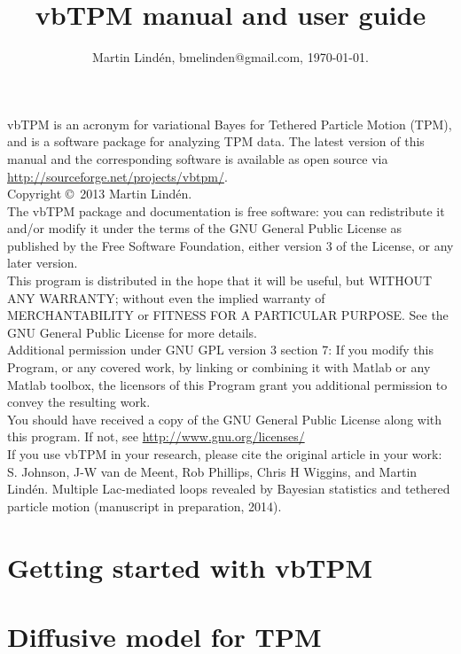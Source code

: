 \documentclass[11pt,letterpaper,twocolumn]{article}
\title{vbTPM manual and user guide}
\author{Martin Lind\'en, bmelinden@gmail.com, \today.}
\date{}
\begin{document}
\onecolumn
\maketitle 
\noindent 
vbTPM is an acronym for variational Bayes for Tethered Particle Motion
(TPM), and is a software package for analyzing TPM data.  The latest
version of this manual and the corresponding software is available as
open source via \url{http://sourceforge.net/projects/vbtpm/}. \bigskip\\
\noindent Copyright \copyright~2013 Martin Lindén. \smallskip\\
\noindent
The vbTPM package and documentation is free software: you can
redistribute it and/or modify it under the terms of the GNU General
Public License as published by the Free Software Foundation, either
version 3 of the License, or any later version.\smallskip\\
\noindent
This program is distributed in the hope that it will be useful, but
WITHOUT ANY WARRANTY; without even the implied warranty of
MERCHANTABILITY or FITNESS FOR A PARTICULAR PURPOSE. See the GNU
General Public License for more details.\smallskip\\
\noindent
Additional permission under GNU GPL version 3 section 7: If you modify
this Program, or any covered work, by linking or combining it with
Matlab or any Matlab toolbox, the licensors of this Program grant you
additional permission to convey the resulting work.\smallskip\\
\noindent 
You should have received a copy of the GNU General Public License
along with this program. If not, see \url{http://www.gnu.org/licenses/}
\bigskip\\\noindent
If you use vbTPM in your research, please cite the original article in your work:
\medskip\\\noindent 
S. Johnson, J-W van de Meent, Rob Phillips, Chris H Wiggins, and
Martin Lindén. Multiple Lac-mediated loops revealed by Bayesian
statistics and tethered particle motion (manuscript in preparation,
2014).


\twocolumn
\tableofcontents
\clearpage
\section{Getting started with vbTPM}

\section{Diffusive model for TPM}

\end{document}
